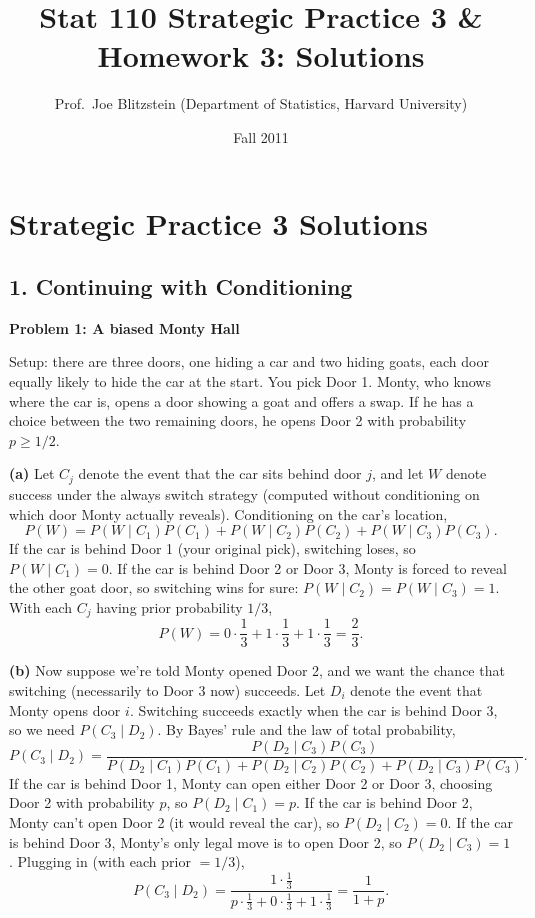 \documentclass{article}
\title{Stat 110 Strategic Practice 3 \& Homework 3: Solutions}
\author{Prof.\ Joe Blitzstein (Department of Statistics, Harvard University)}
\date{Fall 2011}
\begin{document}
\maketitle

\section*{Strategic Practice 3 Solutions}

\subsection*{1. Continuing with Conditioning}

\textbf{Problem 1: A biased Monty Hall}

Setup: there are three doors, one hiding a car and two hiding goats, each door equally likely to hide the car at the start. You pick Door 1. Monty, who knows where the car is, opens a door showing a goat and offers a swap. If he has a choice between the two remaining doors, he opens Door 2 with probability $p \ge 1/2$.

\medskip
\textbf{(a)} Let $C_j$ denote the event that the car sits behind door $j$, and let $W$ denote success under the always switch strategy (computed without conditioning on which door Monty actually reveals). Conditioning on the car's location,
$$
P(W) = P(W\mid C_1)P(C_1) + P(W\mid C_2)P(C_2) + P(W\mid C_3)P(C_3).
$$
If the car is behind Door 1 (your original pick), switching loses, so $P(W\mid C_1)=0$. If the car is behind Door 2 or Door 3, Monty is forced to reveal the other goat door, so switching wins for sure: $P(W\mid C_2)=P(W\mid C_3)=1$. With each $C_j$ having prior probability $1/3$,
$$
P(W) = 0\cdot\frac{1}{3} + 1\cdot\frac{1}{3} + 1\cdot\frac{1}{3} = \frac{2}{3}.
$$

\medskip
\textbf{(b)} Now suppose we're told Monty opened Door 2, and we want the chance that switching (necessarily to Door 3 now) succeeds. Let $D_i$ denote the event that Monty opens door $i$. Switching succeeds exactly when the car is behind Door 3, so we need $P(C_3 \mid D_2)$. By Bayes' rule and the law of total probability,
$$
P(C_3\mid D_2) = \frac{P(D_2\mid C_3)P(C_3)}{P(D_2\mid C_1)P(C_1)+P(D_2\mid C_2)P(C_2)+P(D_2\mid C_3)P(C_3)}.
$$
If the car is behind Door 1, Monty can open either Door 2 or Door 3, choosing Door 2 with probability $p$, so $P(D_2\mid C_1)=p$. If the car is behind Door 2, Monty can't open Door 2 (it would reveal the car), so $P(D_2\mid C_2)=0$. If the car is behind Door 3, Monty's only legal move is to open Door 2, so $P(D_2\mid C_3)=1$. Plugging in (with each prior $=1/3$),
$$
P(C_3\mid D_2) = \frac{1\cdot\frac13}{p\cdot\frac13 + 0\cdot\frac13 + 1\cdot\frac13} = \frac{1}{1+p}.
$$
\end{document}
